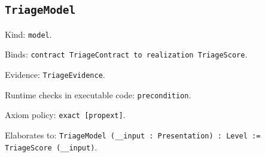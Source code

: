 \documentclass[11pt]{article}
\begin{document}
\subsection*{\texttt{TriageModel}}
\noindent Kind: \texttt{model}.\par
\noindent Binds: \texttt{contract TriageContract to realization TriageScore}.\par
\noindent Evidence: \texttt{TriageEvidence}.\par
\noindent Runtime checks in executable code: \texttt{precondition}.\par
\noindent Axiom policy: \texttt{exact [propext]}.\par
\noindent Elaborates to: \texttt{TriageModel (\_\_input : Presentation) : Level := TriageScore (\_\_input)}.\par
\end{document}
